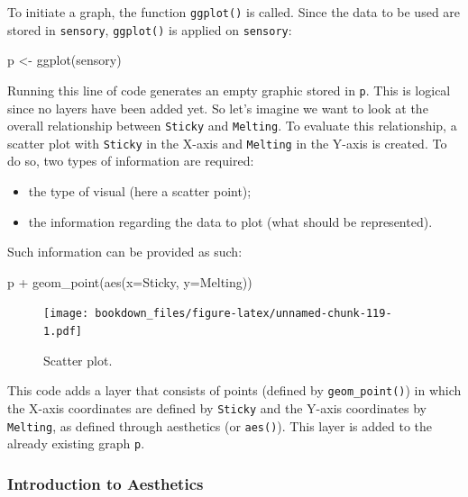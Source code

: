 \documentclass[
]{krantz}
\makeatletter
\newenvironment{Shaded}{\begin{snugshade}}{\end{snugshade}}
\newcommand{\AttributeTok}[1]{\textcolor[rgb]{0.61,0.61,0.61}{#1}}
\newcommand{\FunctionTok}[1]{\textcolor[rgb]{0,0,0}{#1}}
\newcommand{\NormalTok}[1]{#1}
\newcommand{\OtherTok}[1]{\textcolor[rgb]{0.37,0.37,0.37}{#1}}
\newcommand{\SpecialCharTok}[1]{\textcolor[rgb]{0,0,0}{#1}}
\providecommand{\tightlist}{%
  \setlength{\itemsep}{0pt}\setlength{\parskip}{0pt}}
\newenvironment{kframe}{%
\medskip{}
\setlength{\fboxsep}{.8em}
 \def\at@end@of@kframe{}%
 \ifinner\ifhmode%
  \def\at@end@of@kframe{\end{minipage}}%
  \begin{minipage}{\columnwidth}%
 \fi\fi%
 \def\FrameCommand##1{\hskip\@totalleftmargin \hskip-\fboxsep
 \colorbox{shadecolor}{##1}\hskip-\fboxsep
     \hskip-\linewidth \hskip-\@totalleftmargin \hskip\columnwidth}%
 \MakeFramed {\advance\hsize-\width
   \@totalleftmargin\z@ \linewidth\hsize
   \@setminipage}}%
 {\par\unskip\endMakeFramed%
 \at@end@of@kframe}
\renewenvironment{Shaded}{\begin{kframe}}{\end{kframe}}
\makeatother
\begin{document}
To initiate a graph, the function \texttt{ggplot()} is called.
Since the data to be used are stored in \texttt{sensory}, \texttt{ggplot()} is applied on \texttt{sensory}:

\begin{Shaded}
\begin{Highlighting}[]
\NormalTok{p }\OtherTok{\textless{}{-}} \FunctionTok{ggplot}\NormalTok{(sensory)}
\end{Highlighting}
\end{Shaded}

Running this line of code generates an empty graphic stored in \texttt{p}. This is logical since no layers have been added yet.
So let's imagine we want to look at the overall relationship between \texttt{Sticky} and \texttt{Melting}. To evaluate this relationship, a scatter plot with \texttt{Sticky} in the X-axis and \texttt{Melting} in the Y-axis is created. To do so, two types of information are required:

\begin{itemize}
\tightlist
\item
  the type of visual (here a scatter point);
\item
  the information regarding the data to plot (what should be represented).
\end{itemize}

Such information can be provided as such:

\begin{Shaded}
\begin{Highlighting}[]
\NormalTok{p }\SpecialCharTok{+} \FunctionTok{geom\_point}\NormalTok{(}\FunctionTok{aes}\NormalTok{(}\AttributeTok{x=}\NormalTok{Sticky, }\AttributeTok{y=}\NormalTok{Melting))}
\end{Highlighting}
\end{Shaded}

\begin{figure}
\centering
\texttt{[image: bookdown\_files/figure-latex/unnamed-chunk-119-1.pdf]}
\caption{\label{fig:unnamed-chunk-119}Scatter plot.}
\end{figure}

This code adds a layer that consists of points (defined by \texttt{geom\_point()}) in which the X-axis coordinates are defined by \texttt{Sticky} and the Y-axis coordinates by \texttt{Melting}, as defined through aesthetics (or \texttt{aes()}). This layer is added to the already existing graph \texttt{p}.

\hypertarget{scatter}{%
\subsubsection*{Introduction to Aesthetics}\label{scatter}}
\end{document}
